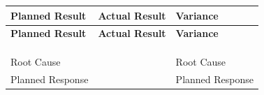 \documentclass[10pt,letterpaper]{article}
\renewcommand\arraystretch{1.25}
\begin{document}
\begin{center}
\begingroup
\setlength\tabcolsep{2.0pt}
\footnotesize
\renewcommand\arraystretch{1.55}
\begin{longtable}{|>{\raggedright\arraybackslash}p{2.120in}|>{\raggedright\arraybackslash}p{2.120in}|>{\raggedright\arraybackslash}p{2.120in}|}
\hline
\rowcolor{light}
\textbf{Planned Result} & \textbf{Actual Result} & \textbf{Variance} \\ \hline
\endfirsthead
\hline\rowcolor{light} \textbf{Planned Result} & \textbf{Actual Result} & \textbf{Variance} \\ \hline
\endhead
\rule{0pt}{11pt}\hspace{0pt} & \rule{0pt}{11pt}\hspace{0pt} & \rule{0pt}{11pt}\hspace{0pt} \\ \hline
\rule{0pt}{11pt}\hspace{0pt} & \rule{0pt}{11pt}\hspace{0pt} & \rule{0pt}{11pt}\hspace{0pt} \\ \hline
\rule{0pt}{11pt}\hspace{0pt} & \rule{0pt}{11pt}\hspace{0pt} & \rule{0pt}{11pt}\hspace{0pt} \\ \hline
Root Cause & \rule{0pt}{11pt}\hspace{0pt} & Root Cause \\ \hline
Planned Response & \rule{0pt}{11pt}\hspace{0pt} & Planned Response \\ \hline
\end{longtable}
\endgroup
\end{center}
\end{document}

